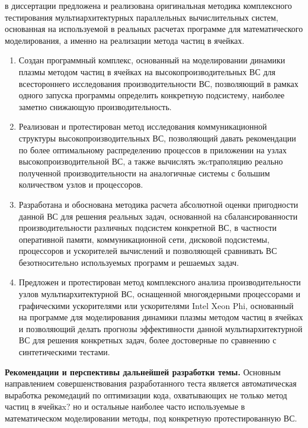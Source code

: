 в диссертации предложена и реализована оригинальная методика комплексного тестирования мультиархитектурных параллельных вычислительных систем, основанная на используемой в реальных расчетах программе для математического моделирования, а именно на реализации метода частиц в ячейках.
\begin{enumerate}
	\item Создан программный комплекс, основанный на моделировании динамики плазмы методом частиц в ячейках на высокопроизводительных ВС для всестороннего исследования производительности ВС, позволяющий в рамках одного запуска программы определить конкретную подсистему, наиболее заметно снижающую производительность. 
	
	\item Реализован и протестирован метод исследования коммуникационной структуры высокопроизводительных ВС, позволяющий давать рекомендации по более оптимальному распределению процессов в приложении на узлах высокопроизводительной ВС, а также вычислять экcтраполяцию реально полученной производительности на аналогичные системы с большим количеством узлов и процессоров.
	
	\item Разработана и обоснована методика расчета абсолютной оценки пригодности данной ВС для решения реальных задач, основанной на сбалансированности производительности различных подсистем конкретной ВС, в частности оперативной памяти, коммуникационной сети, дисковой подсистемы, процессоров и ускорителей вычислений и позволяющей сравнивать ВС безотносительно используемых программ и решаемых задач. 
	
	\item Предложен и протестирован метод комплексного анализа производительности узлов мультиархитектурной ВС, оснащенной многоядерными процессорами и графическими ускорителями или ускорителями Intel Xeon Phi, основанный на программе для моделирования динамики плазмы методом частиц в ячейках и позволяющий делать прогнозы эффективности данной мультиархитектурной ВС для решения конкретных задач, более достоверные по сравнению с синтетическими тестами.
\end{enumerate}


\textbf{Рекомендации и перспективы дальнейшей разработки темы.}
Основным направлением совершенствования разработанного теста является автоматическая выработка рекомедаций по оптимизации кода, охватывающих не только метод частиц в ячейкаx?  но и остальные наиболее часто используемые в математическом моделировании методы,  под конкретную протестированную ВС.

